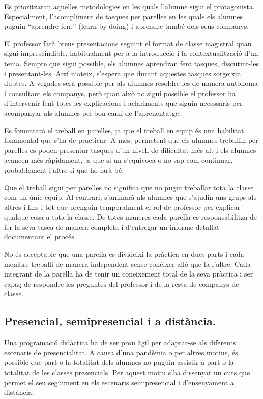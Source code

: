 \documentclass[catalan, a4paper, 12pt, titlepage]{article}
\begin{document}
Es prioritzaran aquelles metodologies en les quals l'alumne sigui el protagonista. Especialment, l'acompliment de tasques per parelles en les quals els alumnes puguin ``aprendre fent'' (learn by doing) i aprendre també dels seus companys.

El professor farà breus presentacions seguint el format de classe magistral quan sigui imprescindible, habitualment per a la introducció i la contextualització d'un tema.
Sempre que sigui possible, els alumnes aprendran fent tasques, discutint-les i presentant-les.
Així mateix, s'espera que durant aquestes tasques sorgeixin dubtes. 
A vegades serà possible per als alumnes resoldre-les de manera autònoma i consultant els companys, però quan això no sigui possible el professor ha d'intervenir fent totes les explicacions i aclariments que siguin necessaris per acompanyar als alumnes pel bon camí de l'aprenentatge.

Es fomentarà el treball en parelles, ja que el treball en equip és una habilitat fonamental que s'ha de practicar.
A més, permetent que els alumnes treballin per parelles es poden presentar tasques d'un nivell de dificultat més alt i els alumnes avancen més ràpidament, ja que si un s'equivoca o no sap com continuar, probablement l'altre sí que ho farà bé.

Que el treball sigui per parelles no significa que no pugui treballar tota la classe com un únic equip.
Al contrari, s'animarà als alumnes que s'ajudin uns grups als altres i fins i tot que prenguin temporalment el rol de professor per explicar qualque cosa a tota la classe.
De totes maneres cada parella es responsabilitza de fer la seva tasca de manera completa i d'entregar un informe detallat documentant el procés.

No és acceptable que una parella es divideixi la pràctica en dues parts i cada membre treballi de manera independent sense conèixer allò que fa l'altre. 
Cada integrant de la parella ha de tenir un coneixement total de la seva pràctica i ser capaç de respondre les preguntes del professor i de la resta de companys de classe.

\subsection{Presencial, semipresencial i a distància.}

Una programació didàctica ha de ser prou àgil per adaptar-se als diferents escenaris de presencialitat.
A causa d'una pandèmia o per altres motius, és possible que part o la totalitat dels alumnes no puguin assistir a part o la totalitat de les classes presencials.
Per aquest motiu s'ha dissenyat un curs que permet el seu seguiment en els escenaris semipresencial i d'ensenyament a distància.
\end{document}
